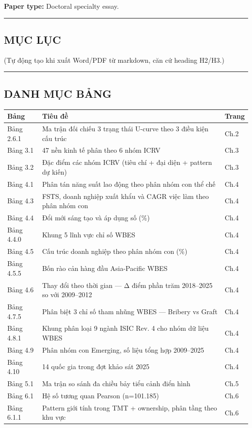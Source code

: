 \documentclass[12pt,a4paper]{article}
\begin{document}
\textbf{Paper type:} Doctoral specialty essay.

\begin{center}\rule{0.5\linewidth}{0.5pt}\end{center}

\hypertarget{mux1ee5c-lux1ee5c}{%
\subsection{MỤC LỤC}\label{mux1ee5c-lux1ee5c}}

(Tự động tạo khi xuất Word/PDF từ markdown, căn cứ heading H2/H3.)

\begin{center}\rule{0.5\linewidth}{0.5pt}\end{center}

\hypertarget{danh-mux1ee5c-bux1ea3ng}{%
\subsection{DANH MỤC BẢNG}\label{danh-mux1ee5c-bux1ea3ng}}

\begin{longtable}[]{@{}lll@{}}
\toprule\noalign{}
Bảng & Tiêu đề & Trang \\
\midrule\noalign{}
\endhead
\bottomrule\noalign{}
\endlastfoot
Bảng 2.6.1 & Ma trận đối chiếu 3 trạng thái U-curve theo 3 điều kiện cấu
trúc & Ch.2 \\
Bảng 3.1 & 47 nền kinh tế phân theo 6 nhóm ICRV & Ch.3 \\
Bảng 3.2 & Đặc điểm các nhóm ICRV (tiêu chí + đại diện + pattern dự
kiến) & Ch.3 \\
Bảng 4.1 & Phân tán năng suất lao động theo phân nhóm con thể chế &
Ch.4 \\
Bảng 4.3 & FSTS, doanh nghiệp xuất khẩu và CAGR việc làm theo phân nhóm
con & Ch.4 \\
Bảng 4.4 & Đổi mới sáng tạo và áp dụng số (\%) & Ch.4 \\
Bảng 4.4.0 & Khung 5 lĩnh vực chỉ số WBES & Ch.4 \\
Bảng 4.5 & Cấu trúc doanh nghiệp theo phân nhóm con (\%) & Ch.4 \\
Bảng 4.5.5 & Bốn rào cản hàng đầu Asia-Pacific WBES & Ch.4 \\
Bảng 4.6 & Thay đổi theo thời gian --- Δ điểm phần trăm 2018--2025 so
với 2009--2012 & Ch.4 \\
Bảng 4.7.5 & Phân biệt 3 chỉ số tham nhũng WBES --- Bribery vs Graft &
Ch.4 \\
Bảng 4.8.1 & Khung phân loại 9 ngành ISIC Rev. 4 cho nhóm dữ liệu WBES &
Ch.4 \\
Bảng 4.9 & Phân nhóm con Emerging, số liệu tổng hợp 2009--2025 & Ch.4 \\
Bảng 4.10 & 14 quốc gia trong đợt khảo sát 2025 & Ch.4 \\
Bảng 5.1 & Ma trận so sánh đa chiều bảy tiểu cảnh điển hình & Ch.5 \\
Bảng 6.1 & Hệ số tương quan Pearson (n=101.185) & Ch.6 \\
Bảng 6.1.1 & Pattern giới tính trong TMT + ownership, phân tầng theo khu
vực & Ch.6 \\
\end{longtable}
\end{document}
